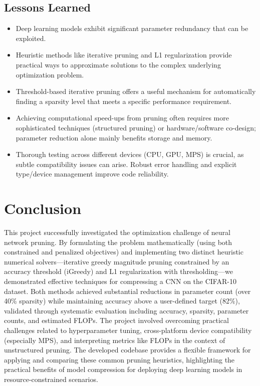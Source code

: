 \documentclass[10pt, article]{article} %
\begin{document}
\subsection{Lessons Learned}
\begin{itemize}
    \item Deep learning models exhibit significant parameter redundancy that can be exploited.
    \item Heuristic methods like iterative pruning and L1 regularization provide practical ways to approximate solutions to the complex underlying optimization problem.
    \item Threshold-based iterative pruning offers a useful mechanism for automatically finding a sparsity level that meets a specific performance requirement.
    \item Achieving computational speed-ups from pruning often requires more sophisticated techniques (structured pruning) or hardware/software co-design; parameter reduction alone mainly benefits storage and memory.
    \item Thorough testing across different devices (CPU, GPU, MPS) is crucial, as subtle compatibility issues can arise. Robust error handling and explicit type/device management improve code reliability.
\end{itemize}

\section{Conclusion}
This project successfully investigated the optimization challenge of neural network pruning. By formulating the problem mathematically (using both constrained and penalized objectives) and implementing two distinct heuristic numerical solvers—iterative greedy magnitude pruning constrained by an accuracy threshold (iGreedy) and L1 regularization with thresholding—we demonstrated effective techniques for compressing a CNN on the CIFAR-10 dataset. Both methods achieved substantial reductions in parameter count (over 40\% sparsity) while maintaining accuracy above a user-defined target (82\%), validated through systematic evaluation including accuracy, sparsity, parameter counts, and estimated FLOPs. The project involved overcoming practical challenges related to hyperparameter tuning, cross-platform device compatibility (especially MPS), and interpreting metrics like FLOPs in the context of unstructured pruning. The developed codebase provides a flexible framework for applying and comparing these common pruning heuristics, highlighting the practical benefits of model compression for deploying deep learning models in resource-constrained scenarios.
\end{document}

